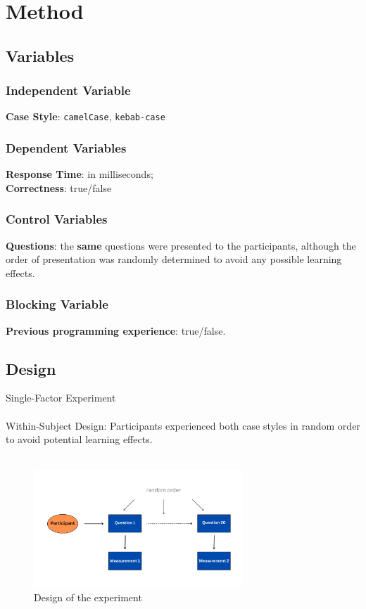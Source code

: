 \documentclass[unicode,11pt,a4paper,oneside,numbers=endperiod,openany]{scrartcl}
\begin{document}
\section{Method}

\subsection{Variables}
\subsubsection{Independent Variable} 
\textbf{Case Style}: \texttt{camelCase}, \texttt{kebab-case}

\subsubsection{Dependent Variables}
\textbf{Response Time}: in milliseconds; \\
\textbf{Correctness}: true/false

\subsubsection{Control Variables}
\textbf{Questions}: the \textbf{same} questions were presented to the participants, although the order of presentation was randomly determined to avoid any possible learning effects.\\

\subsubsection{Blocking Variable}
\textbf{Previous programming experience}: true/false.

\subsection{Design}
Single-Factor Experiment \\
\hfill \\
Within-Subject Design: Participants experienced both case styles in random order to avoid potential learning effects.
\\
\hfill \\
\begin{figure}[h!]
    \centering
    \includegraphics[width=0.7\textwidth]{./figures/graph.pdf}
    \caption{Design of the experiment}
    \label{fig:graph}
\end{figure}
\end{document}
